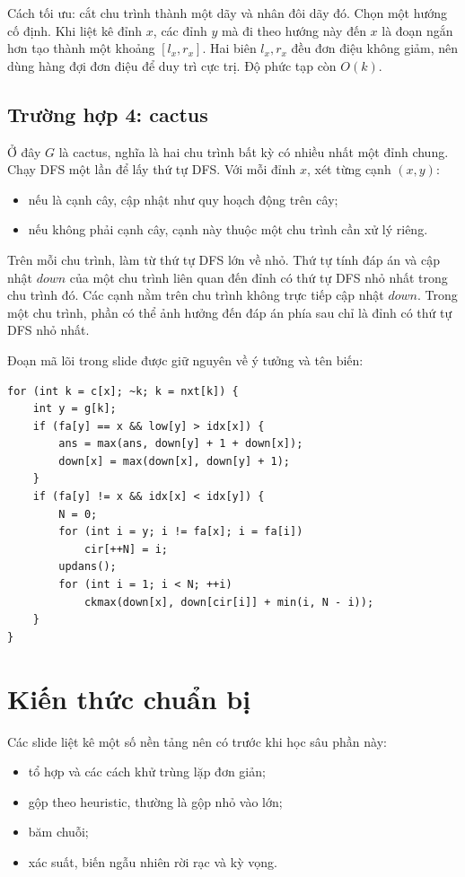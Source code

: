 \documentclass[11pt]{article}
\begin{document}
Cách tối ưu: cắt chu trình thành một dãy và nhân đôi dãy đó. Chọn một hướng cố
định. Khi liệt kê đỉnh \(x\), các đỉnh \(y\) mà đi theo hướng này đến \(x\) là
đoạn ngắn hơn tạo thành một khoảng \([l_x,r_x]\). Hai biên \(l_x,r_x\) đều đơn
điệu không giảm, nên dùng hàng đợi đơn điệu để duy trì cực trị. Độ phức tạp còn
\(O(k)\).

\subsection{Trường hợp 4: cactus}

Ở đây \(G\) là cactus, nghĩa là hai chu trình bất kỳ có nhiều nhất một đỉnh
chung. Chạy DFS một lần để lấy thứ tự DFS. Với mỗi đỉnh \(x\), xét từng cạnh
\((x,y)\):
\begin{itemize}
  \item nếu là cạnh cây, cập nhật như quy hoạch động trên cây;
  \item nếu không phải cạnh cây, cạnh này thuộc một chu trình cần xử lý riêng.
\end{itemize}

Trên mỗi chu trình, làm từ thứ tự DFS lớn về nhỏ. Thứ tự tính đáp án và cập
nhật \(down\) của một chu trình liên quan đến đỉnh có thứ tự DFS nhỏ nhất trong
chu trình đó. Các cạnh nằm trên chu trình không trực tiếp cập nhật \(down\).
Trong một chu trình, phần có thể ảnh hưởng đến đáp án phía sau chỉ là đỉnh có
thứ tự DFS nhỏ nhất.

Đoạn mã lõi trong slide được giữ nguyên về ý tưởng và tên biến:

\begin{verbatim}
for (int k = c[x]; ~k; k = nxt[k]) {
    int y = g[k];
    if (fa[y] == x && low[y] > idx[x]) {
        ans = max(ans, down[y] + 1 + down[x]);
        down[x] = max(down[x], down[y] + 1);
    }
    if (fa[y] != x && idx[x] < idx[y]) {
        N = 0;
        for (int i = y; i != fa[x]; i = fa[i])
            cir[++N] = i;
        updans();
        for (int i = 1; i < N; ++i)
            ckmax(down[x], down[cir[i]] + min(i, N - i));
    }
}
\end{verbatim}

\section{Kiến thức chuẩn bị}

Các slide liệt kê một số nền tảng nên có trước khi học sâu phần này:
\begin{itemize}
  \item tổ hợp và các cách khử trùng lặp đơn giản;
  \item gộp theo heuristic, thường là gộp nhỏ vào lớn;
  \item băm chuỗi;
  \item xác suất, biến ngẫu nhiên rời rạc và kỳ vọng.
\end{itemize}
\end{document}
